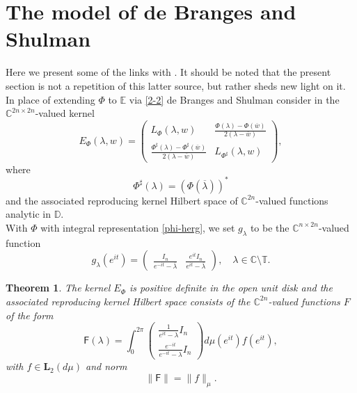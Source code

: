 \documentclass[12pt]{amsart}
\newtheorem{thm}{Theorem}[section]
\theoremstyle{definition}
\theoremstyle{remark}
\numberwithin{equation}{section}
\begin{document}
\section{The model of de Branges and Shulman}
\setcounter{equation}{0}
\label{2.1}
Here we present some of the links with \cite{dbs}. It should be noted that the present section is not a repetition of this latter source, but rather sheds new light on it.
In place of extending $\Phi$ to $\mathbb E$ via \eqref{2-2} de Branges and Shulman consider in \cite{dbs} the $\mathbb C^{2n\times 2n}$-valued kernel
\begin{equation}
  \label{ephi}
  E_\Phi({\lambda},w)=\begin{pmatrix}L_\Phi({\lambda},w)&\frac{\Phi({\lambda})-\Phi(\overline{w})}{2(\lambda-\overline{w})}\\
                \frac{\Phi^\sharp({\lambda})-\Phi^\sharp(\overline{w})}{2(\lambda-\overline{w})}&L_{\Phi^\sharp}({\lambda},w)\end{pmatrix},
            \end{equation}
where \begin{equation}
  \Phi^\sharp(\lambda)=(\Phi(\overline{\lambda}))^*
\end{equation}
and the associated reproducing kernel Hilbert space of $\mathbb C^{2n}$-valued functions analytic in $\mathbb D$.\\

With $\Phi$ with integral representation \eqref{phi-herg}, we set $g_\lambda$ to be the $\mathbb C^{n\times 2n}$-valued function
\begin{equation}
  g_{\lambda}(e^{it})=\begin{pmatrix} \frac{I_n}{e^{-it} -\overline{{\lambda}}}&\frac{e^{it}I_n}{e^{it}-\overline{{\lambda}}}\end{pmatrix},\quad \lambda\in\mathbb C\setminus\mathbb T.
\end{equation}






            \begin{thm}
 The kernel $E_\Phi$ is positive definite in the open unit disk and the associated reproducing kernel Hilbert space consists of the $\mathbb C^{2n}$-valued functions $F$ of the form
 \begin{equation}
\label{f-mu}
   \mathsf F(\lambda)=\int_0^{2\pi}\begin{pmatrix} \frac{1}{e^{it}-{\lambda}}I_n\\ \frac{e^{-it}}{e^{-it}-{\lambda}}I_n\end{pmatrix}d\mu(e^{it})f(e^{it}),
\end{equation}
with $f\in\mathbf L_2(d\mu)$ and norm
\[
  \|\mathsf F\|=\|f\|_\mu.
  \]
\end{thm}
\end{document}
